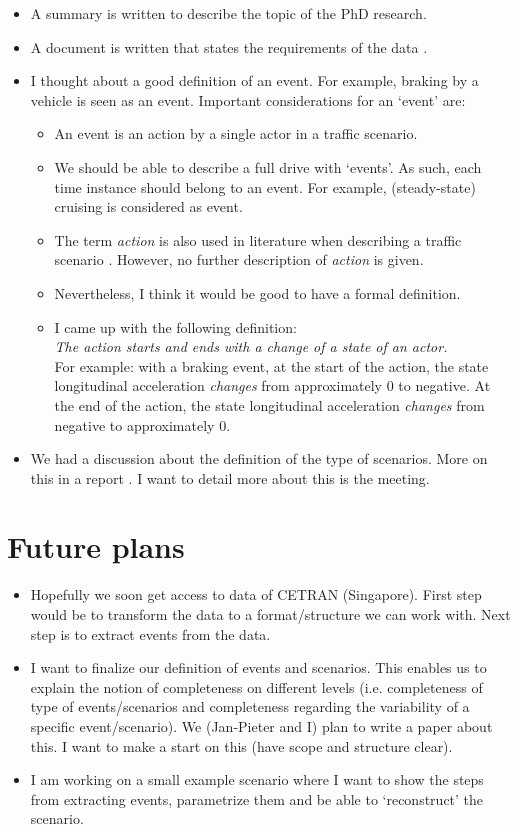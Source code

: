 \documentclass[10pt,final,a4paper,oneside,onecolumn]{article}
\begin{document}
\begin{itemize}
	\item A summary is written to describe the topic of the PhD research.
	\item A document is written that states the requirements of the data \cite{data_requirements}.
	\item I thought about a good definition of an event. For example, braking by a vehicle is seen as an event. Important considerations for an `event' are:
	\begin{itemize}
		\item An event is an action by a single actor in a traffic scenario.
		\item We should be able to describe a full drive with `events'. As such, each time instance should belong to an event. For example, (steady-state) cruising is considered as event.
		\item The term \emph{action} is also used in literature when describing a traffic scenario \cite{scenario_ontology,ulbrich2015}. However, no further description of \emph{action} is given.
		\item Nevertheless, I think it would be good to have a formal definition.
		\item I came up with the following definition:\\
		\emph{The action starts and ends with a change of a state of an actor.} \\
		For example: with a braking event, at the start of the action, the state longitudinal acceleration \emph{changes} from approximately 0 to negative. At the end of the action, the state longitudinal acceleration \emph{changes} from negative to approximately 0.
	\end{itemize}
	\item We had a discussion about the definition of the type of scenarios. More on this in a report \cite{categorizationScenarios}. I want to detail more about this is the meeting.
\end{itemize}

\section*{Future plans}
\begin{itemize}
	\item Hopefully we soon get access to data of CETRAN (Singapore). First step would be to transform the data to a format/structure we can work with. Next step is to extract events from the data.
	\item I want to finalize our definition of events and scenarios. This enables us to explain the notion of completeness on different levels (i.e. completeness of type of events/scenarios and completeness regarding the variability of a specific event/scenario). We (Jan-Pieter and I) plan to write a paper about this. I want to make a start on this (have scope and structure clear).
	\item I am working on a small example scenario where I want to show the steps from extracting events, parametrize them and be able to `reconstruct' the scenario.
\end{itemize}
\end{document}
